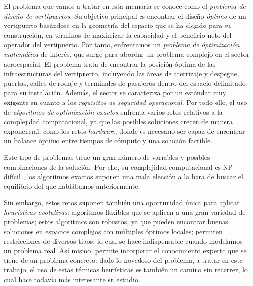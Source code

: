\documentclass[12pt,a4paper]{book}
\begin{document}
El problema que vamos a tratar en esta memoria se conoce como el \textsl{problema de diseño de vertipuertos}. Su objetivo principal es encontrar el diseño \textsl{óptimo} de un vertipuerto basándose en la geometría del espacio que se ha elegido para su construcción, en términos de maximizar la capacidad y el beneficio neto del operador del vertipuerto. Por tanto, enfrentamos un \textsl{problema de óptimización matemática} de interés, que surge para abordar un problema complejo en el sector aeroespacial. El problema trata de encontrar la posición óptima de las infraestructuras del vertipuerto, incluyendo las áreas de aterrizaje y despegue, puertas, calles de rodaje y terminales de pasajeros dentro del espacio delimitado para su instalación. Además, el sector se caracteriza por un estándar muy exigente en cuanto a los \textsl{requisitos de seguridad operacional}. Por todo ello, el uso de \textsl{algoritmos de optimización exactos} enfrenta varios retos relativos a la complejidad computacional, ya que las posibles soluciones crecen de manera exponencial, como los retos \textsl{hardware}, donde es necesario ser capaz de encontrar un balance óptimo entre tiempos de cómputo y una solución factible.

Este tipo de problemas tiene un gran número de variables y posibles combinaciones de la solución. Por ello, su complejidad computacional es NP-difícil \cite{espejo-diaz_heuristic_2023}, los algoritmos exactos suponen una mala elección a la hora de buscar el equilibrio del que hablábamos anteriormente.  

Sin embargo, estos retos suponen también una oportunidad única para aplicar {\sl heurísticas evolutivas}: algoritmos flexibles que se aplican a una gran variedad de problemas; estos algoritmos son robustos, ya que pueden encontrar buenas soluciones en espacios complejos con múltiples óptimos locales; permiten restricciones de diversos tipos, lo cual se hace indispensable cuando modelamos un problema real. Así mismo, permite incorporar el conocimiento experto que se tiene de un problema concreto: dado lo novedoso del problema, a tratar en este trabajo, el uso de estas técnicas heurísticas es también un camino sin recorrer, lo cual hace todavía más interesante su estudio.
\end{document}
